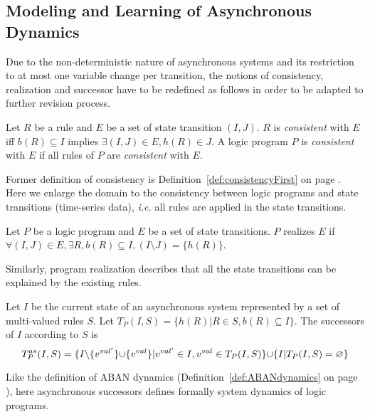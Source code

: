 \subsection{Modeling and Learning of Asynchronous Dynamics}\label{sec:alfit}

Due to the non-deterministic nature of asynchronous systems and its restriction to at most one variable change per transition,
the notions of consistency, realization and successor have to be redefined as follows in order to be adapted to further revision process.

\begin{definition}[Consistency]\label{def:consistencySecond}
	Let $R$ be a rule and $E$ be a set of state transition $(I,J)$.
	$R$ is {\it consistent} with $E$ iff
	$b(R)\subseteq I$ implies $\exists (I,J) \in E, h(R) \in J$.
	A logic program $P$ is {\it consistent} with $E$ if all rules of $P$ are {\it consistent} with $E$.
\end{definition}

Former definition of consistency is Definition~\ref{def:consistencyFirst} on page \pageref{def:consistencyFirst}.
Here we enlarge the domain to the consistency between logic programs and state transitions (time-series data), \textit{i.e.} all rules are applied in the state transitions. 

\begin{definition}
	Let $P$ be a logic program and $E$ be a set of state transitions.
	$P$ realizes $E$ if $\forall (I,J) \in E, \exists R, b(R) \subseteq I, (I \setminus J) = \{h(R)\}$.
\end{definition}

Similarly, program realization describes that all the state transitions can be explained by the existing rules.

\begin{definition}
	Let $I$ be the current state of an asynchronous system represented by a set of multi-valued rules $S$.
	Let $T_P(I,S) = \{h(R) | R \in S, b(R) \subseteq I\}$.
	The successors of $I$ according to $S$ is
	$$T_P^{as}(I,S) = \{I \miset{v^{val'}} \addset{v^{val}} | v^{val'} \in I, v^{val} \in T_P(I,S)\} \addset{I|T_P(I,S) = \varnothing}$$ %
\end{definition}

Like the definition of ABAN dynamics (Definition~\ref{def:ABANdynamics} on page \pageref{def:ABANdynamics}), here asynchronous successors defines formally system dynamics of logic programs.

